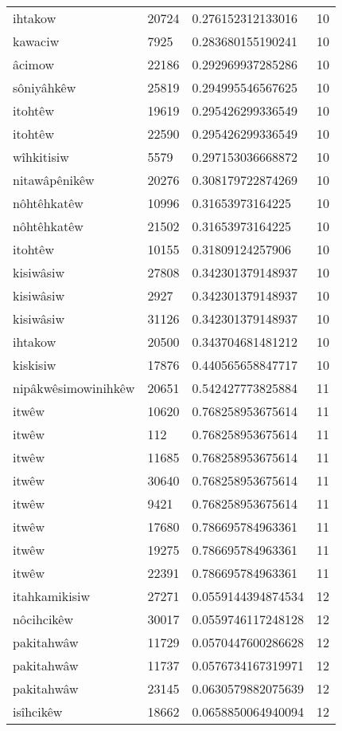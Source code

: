 \begin{longtable}{llll}
ihtakow & 20724 & 0.276152312133016 & 10 \\
kawaciw & 7925 & 0.283680155190241 & 10 \\
âcimow & 22186 & 0.292969937285286 & 10 \\
sôniyâhkêw & 25819 & 0.294995546567625 & 10 \\
itohtêw & 19619 & 0.295426299336549 & 10 \\
itohtêw & 22590 & 0.295426299336549 & 10 \\
wîhkitisiw & 5579 & 0.297153036668872 & 10 \\
nitawâpênikêw & 20276 & 0.308179722874269 & 10 \\
nôhtêhkatêw & 10996 & 0.31653973164225 & 10 \\
nôhtêhkatêw & 21502 & 0.31653973164225 & 10 \\
itohtêw & 10155 & 0.31809124257906 & 10 \\
kisiwâsiw & 27808 & 0.342301379148937 & 10 \\
kisiwâsiw & 2927 & 0.342301379148937 & 10 \\
kisiwâsiw & 31126 & 0.342301379148937 & 10 \\
ihtakow & 20500 & 0.343704681481212 & 10 \\
kiskisiw & 17876 & 0.440565658847717 & 10 \\
nipâkwêsimowinihkêw & 20651 & 0.542427773825884 & 11 \\
itwêw & 10620 & 0.768258953675614 & 11 \\
itwêw & 112 & 0.768258953675614 & 11 \\
itwêw & 11685 & 0.768258953675614 & 11 \\
itwêw & 30640 & 0.768258953675614 & 11 \\
itwêw & 9421 & 0.768258953675614 & 11 \\
itwêw & 17680 & 0.786695784963361 & 11 \\
itwêw & 19275 & 0.786695784963361 & 11 \\
itwêw & 22391 & 0.786695784963361 & 11 \\
itahkamikisiw & 27271 & 0.0559144394874534 & 12 \\
nôcihcikêw & 30017 & 0.0559746117248128 & 12 \\
pakitahwâw & 11729 & 0.0570447600286628 & 12 \\
pakitahwâw & 11737 & 0.0576734167319971 & 12 \\
pakitahwâw & 23145 & 0.0630579882075639 & 12 \\
isîhcikêw & 18662 & 0.0658850064940094 & 12 \\

\end{longtable}
